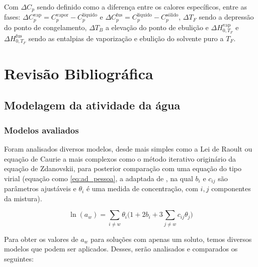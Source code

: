 \documentclass[
	12pt,				%
	openright,
	twoside,
	a4paper,			%
	english,			%
	french,				%
	spanish,			%
	brazil				%
	]{abntex2}
\begin{document}
Com $\Delta C_p$ sendo definido como a diferença entre os calores
específicos, entre as fases: $\Delta C_p^\text{vap} = C_p^\text{vapor} -%
C_p^\text{líquido}$ e $\Delta C_p^\text{fus} = C_p^\text{líquido} -%
C_p^\text{sólido}$, $\Delta T_F$ sendo a depressão do ponto de congelamento,
$\Delta T_B$ a elevação do ponto de ebulição e $\Delta H_{0,T_F}^\text{vap}$ e
$\Delta H_{0,T_F}^\text{fus}$ sendo as entalpias de vaporização e ebulição do
solvente puro a $T_F$.

\chapter{Revisão Bibliográfica}

\section{Modelagem da atividade da água}

\subsection{Modelos avaliados}

Foram analisados diversos modelos, desde mais simples como a Lei de Raoult ou
equação de Caurie a mais complexos como o método iterativo originário da equação
de Zdanovskii, para posterior comparação com uma equação do tipo virial (equação
como \ref{eq:ad_pessoa}, a adaptada de \cite{pessoa2008}, na qual $b_i$ e
$c_{ij}$ são parâmetros ajustáveis e $\theta_i$ é uma medida de concentração,
com $i,j$ componentes da mistura).

\begin{equation}
	\label{eq:ad_pessoa}
	\ln(a_w) = \sum_{i \neq w}\theta_i\Bigg(1 +%
	2b_i+3\sum_{j \neq w}c_{ij}\theta_j\Bigg)
\end{equation}

Para obter os valores de $a_w$ para soluções com apenas um soluto, temos
diversos modelos que podem ser aplicados. Desses, serão analisados e comparados
os seguintes:
\end{document}
